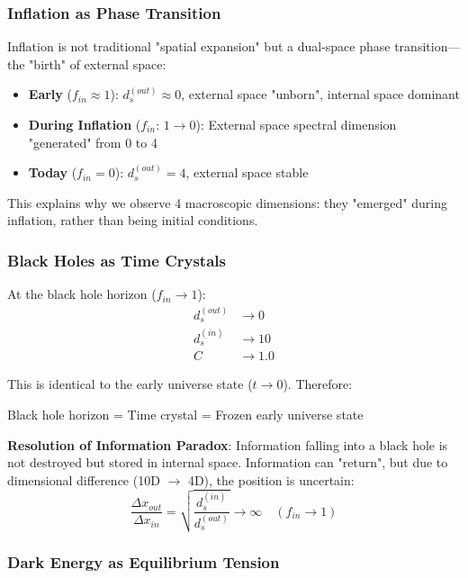 \subsubsection{Inflation as Phase Transition}

Inflation is not traditional "spatial expansion" but a dual-space phase transition—the "birth" of external space:

\begin{itemize}
    \item \textbf{Early} ($f_{in} \approx 1$): $d_s^{(out)} \approx 0$, external space "unborn", internal space dominant
    \item \textbf{During Inflation} ($f_{in}$: $1 \to 0$): External space spectral dimension "generated" from 0 to 4
    \item \textbf{Today} ($f_{in} = 0$): $d_s^{(out)} = 4$, external space stable
\end{itemize}

This explains why we observe 4 macroscopic dimensions: they "emerged" during inflation, rather than being initial conditions.

\subsubsection{Black Holes as Time Crystals}

At the black hole horizon ($f_{in} \to 1$):
\begin{align}
d_s^{(out)} &\to 0 \\
d_s^{(in)} &\to 10 \\
C &\to 1.0
\end{align}

This is identical to the early universe state ($t \to 0$). Therefore:
\begin{insight}
Black hole horizon = Time crystal = Frozen early universe state
\end{insight}

\textbf{Resolution of Information Paradox}: Information falling into a black hole is not destroyed but stored in internal space. Information can "return", but due to dimensional difference (10D $\to$ 4D), the position is uncertain:
\begin{equation}
\frac{\Delta x_{out}}{\Delta x_{in}} = \sqrt{\frac{d_s^{(in)}}{d_s^{(out)}}} \to \infty \quad (f_{in} \to 1)
\end{equation}

\subsubsection{Dark Energy as Equilibrium Tension}

